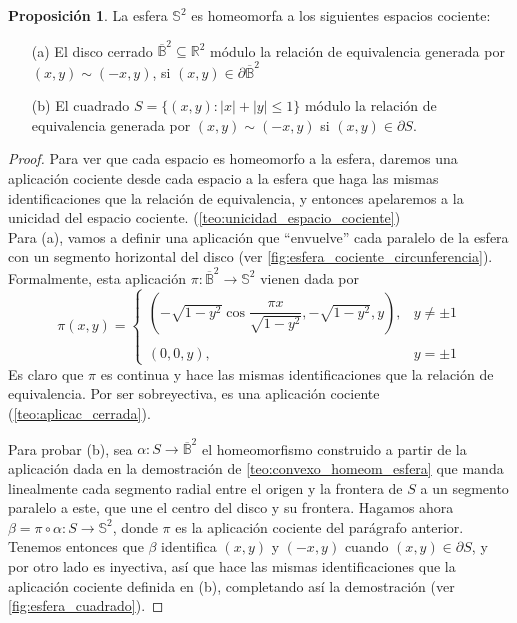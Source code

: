 \documentclass[10pt]{report}
\theoremstyle{definition}
\newtheorem{prop}[defin]{Proposición}
\begin{document}
\begin{prop}%
\label{prop:Esfera como cociente de disco y cuadrado}
La esfera $\mathbb{S}^2$ es homeomorfa a los siguientes espacios cociente: 
\begin{itemize}
\item[(a)] El disco cerrado $\overline{\mathbb{B}}^2\subseteq \mathbb{R}^2$ módulo la relación de equivalencia generada por $(x,y)\sim (-x,y)$, si $(x,y)\in \partial \overline{\mathbb{B}}^2$
\item[(b)] El cuadrado $S=\{(x,y):|x|+|y|\leq 1\}$ módulo la relación de equivalencia generada por $(x,y)\sim(-x,y)$ si $(x,y)\in \partial S$.
\end{itemize}
\end{prop}
\begin{proof}
Para ver que cada espacio es homeomorfo a la esfera, daremos una aplicación cociente desde cada espacio a la esfera que haga las mismas identificaciones que la relación de equivalencia, y entonces apelaremos a la unicidad del espacio cociente. (\autoref{teo:unicidad_espacio_cociente})\\
Para (a), vamos a definir una aplicación que ``envuelve'' cada paralelo de la esfera con un segmento horizontal del disco (ver \autoref{fig:esfera_cociente_circunferencia}).
Formalmente, esta aplicación $\pi:\overline{\mathbb{B}}^2\to \mathbb{S}^2$ vienen dada por 
$$\pi(x,y)=\left\{\begin{array}{lc}
			(-\sqrt{1-y^2} \cos\dfrac{\pi x}{\sqrt{1-y^2}}, -\sqrt{1-y^2}, y), & y\neq \pm 1 \\
			\\(0,0,y), & y=\pm1 

\end{array}
\right.$$
Es claro que $\pi$ es continua y hace las mismas identificaciones que la relación de equivalencia. Por ser sobreyectiva, es una aplicación cociente (\autoref{teo:aplicac_cerrada}).

Para probar (b), sea $\alpha:S\to \overline{\mathbb{B}}^2$ el homeomorfismo construido a partir de la aplicación dada en la demostración de \autoref{teo:convexo_homeom_esfera} que manda linealmente cada segmento radial entre el origen y la frontera de $S$ a un segmento paralelo a este, que une el centro del disco y su frontera. Hagamos ahora $\beta=\pi \circ \alpha : S \to \mathbb{S}^2$, donde $\pi$ es la aplicación cociente del parágrafo anterior. Tenemos entonces que $\beta$ identifica $(x,y)$ y $(-x,y)$ cuando $(x,y)\in \partial S$, y por otro lado es inyectiva, así que hace las mismas identificaciones que la aplicación cociente definida en (b), completando así la demostración (ver \autoref{fig:esfera_cuadrado}). 
\end{proof}
\end{document}

